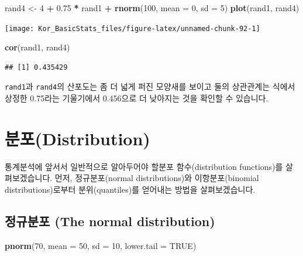 \documentclass[]{book}
\newenvironment{Shaded}{\begin{snugshade}}{\end{snugshade}}
\newcommand{\DataTypeTok}[1]{\textcolor[rgb]{0.13,0.29,0.53}{#1}}
\newcommand{\DecValTok}[1]{\textcolor[rgb]{0.00,0.00,0.81}{#1}}
\newcommand{\FloatTok}[1]{\textcolor[rgb]{0.00,0.00,0.81}{#1}}
\newcommand{\KeywordTok}[1]{\textcolor[rgb]{0.13,0.29,0.53}{\textbf{#1}}}
\newcommand{\NormalTok}[1]{#1}
\newcommand{\OperatorTok}[1]{\textcolor[rgb]{0.81,0.36,0.00}{\textbf{#1}}}
\newcommand{\OtherTok}[1]{\textcolor[rgb]{0.56,0.35,0.01}{#1}}
\newcommand{\StringTok}[1]{\textcolor[rgb]{0.31,0.60,0.02}{#1}}
\begin{document}
\begin{Shaded}
\begin{Highlighting}[]
\NormalTok{rand4 <-}\StringTok{ }\DecValTok{4} \OperatorTok{+}\StringTok{ }\FloatTok{0.75} \OperatorTok{*}\StringTok{ }\NormalTok{rand1 }\OperatorTok{+}\StringTok{ }\KeywordTok{rnorm}\NormalTok{(}\DecValTok{100}\NormalTok{, }\DataTypeTok{mean =} \DecValTok{0}\NormalTok{, }\DataTypeTok{sd =} \DecValTok{5}\NormalTok{)}
\KeywordTok{plot}\NormalTok{(rand1, rand4)}
\end{Highlighting}
\end{Shaded}

\begin{center}\texttt{[image: Kor\_BasicStats\_files/figure-latex/unnamed-chunk-92-1]} \end{center}

\begin{Shaded}
\begin{Highlighting}[]
\KeywordTok{cor}\NormalTok{(rand1, rand4)}
\end{Highlighting}
\end{Shaded}

\begin{verbatim}
## [1] 0.435429
\end{verbatim}

\texttt{rand1}과 \texttt{rand4}의 산포도는 좀 더 넓게 퍼진 모양새를 보이고 둘의 상관관계는 식에서 상정한 0.75라는 기울기에서 0.456으로 더 낮아지는 것을 확인할 수 있습니다.

\hypertarget{uxbd84uxd3ecdistribution}{%
\section{분포(Distribution)}\label{uxbd84uxd3ecdistribution}}

통계분석에 앞서서 일반적으로 알아두어야 할분포 함수(distribution functions)를 살펴보겠습니다. 먼저, 정규분포(normal distributions)와 이항분포(binomial distributions)로부터 분위(quantiles)를 얻어내는 방법을 살펴보겠습니다.

\hypertarget{uxc815uxaddcuxbd84uxd3ec-the-normal-distribution}{%
\subsection{정규분포 (The normal distribution)}\label{uxc815uxaddcuxbd84uxd3ec-the-normal-distribution}}

\begin{Shaded}
\begin{Highlighting}[]
\KeywordTok{pnorm}\NormalTok{(}\DecValTok{70}\NormalTok{, }\DataTypeTok{mean =} \DecValTok{50}\NormalTok{, }\DataTypeTok{sd =} \DecValTok{10}\NormalTok{, }\DataTypeTok{lower.tail =} \OtherTok{TRUE}\NormalTok{)}
\end{Highlighting}
\end{Shaded}
\end{document}
